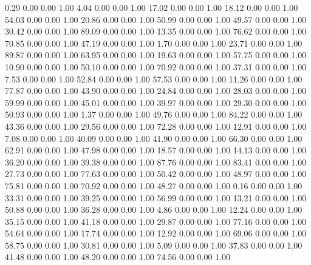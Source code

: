     0.29   0.00   0.00   1.00
    4.04   0.00   0.00   1.00
   17.02   0.00   0.00   1.00
   18.12   0.00   0.00   1.00
   54.03   0.00   0.00   1.00
   20.86   0.00   0.00   1.00
   50.99   0.00   0.00   1.00
   49.57   0.00   0.00   1.00
   30.42   0.00   0.00   1.00
   89.09   0.00   0.00   1.00
   13.35   0.00   0.00   1.00
   76.62   0.00   0.00   1.00
   70.85   0.00   0.00   1.00
   47.19   0.00   0.00   1.00
    1.70   0.00   0.00   1.00
   23.71   0.00   0.00   1.00
   89.87   0.00   0.00   1.00
   63.95   0.00   0.00   1.00
   19.63   0.00   0.00   1.00
   57.75   0.00   0.00   1.00
   10.90   0.00   0.00   1.00
   50.10   0.00   0.00   1.00
   70.92   0.00   0.00   1.00
   37.31   0.00   0.00   1.00
    7.53   0.00   0.00   1.00
   52.84   0.00   0.00   1.00
   57.53   0.00   0.00   1.00
   11.26   0.00   0.00   1.00
   77.87   0.00   0.00   1.00
   43.90   0.00   0.00   1.00
   24.84   0.00   0.00   1.00
   28.03   0.00   0.00   1.00
   59.99   0.00   0.00   1.00
   45.01   0.00   0.00   1.00
   39.97   0.00   0.00   1.00
   29.30   0.00   0.00   1.00
   50.93   0.00   0.00   1.00
    1.37   0.00   0.00   1.00
   49.76   0.00   0.00   1.00
   84.22   0.00   0.00   1.00
   43.36   0.00   0.00   1.00
   29.56   0.00   0.00   1.00
   72.28   0.00   0.00   1.00
   12.91   0.00   0.00   1.00
    7.08   0.00   0.00   1.00
   40.09   0.00   0.00   1.00
   41.90   0.00   0.00   1.00
   66.30   0.00   0.00   1.00
   62.91   0.00   0.00   1.00
   47.98   0.00   0.00   1.00
   18.57   0.00   0.00   1.00
   14.13   0.00   0.00   1.00
   36.20   0.00   0.00   1.00
   39.38   0.00   0.00   1.00
   87.76   0.00   0.00   1.00
   83.41   0.00   0.00   1.00
   27.73   0.00   0.00   1.00
   77.63   0.00   0.00   1.00
   50.42   0.00   0.00   1.00
   48.97   0.00   0.00   1.00
   75.81   0.00   0.00   1.00
   70.92   0.00   0.00   1.00
   48.27   0.00   0.00   1.00
    0.16   0.00   0.00   1.00
   33.31   0.00   0.00   1.00
   39.25   0.00   0.00   1.00
   56.99   0.00   0.00   1.00
   13.21   0.00   0.00   1.00
   50.88   0.00   0.00   1.00
   36.28   0.00   0.00   1.00
    4.86   0.00   0.00   1.00
   12.24   0.00   0.00   1.00
   35.15   0.00   0.00   1.00
   41.18   0.00   0.00   1.00
   29.87   0.00   0.00   1.00
   77.16   0.00   0.00   1.00
   54.64   0.00   0.00   1.00
   17.74   0.00   0.00   1.00
   12.92   0.00   0.00   1.00
   69.06   0.00   0.00   1.00
   58.75   0.00   0.00   1.00
   30.81   0.00   0.00   1.00
    5.09   0.00   0.00   1.00
   37.83   0.00   0.00   1.00
   41.48   0.00   0.00   1.00
   48.20   0.00   0.00   1.00
   74.56   0.00   0.00   1.00

